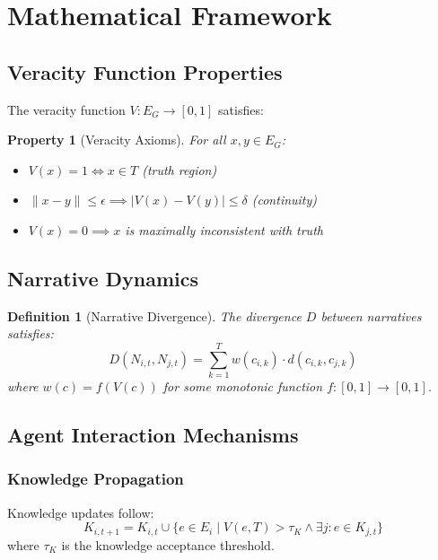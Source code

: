 \documentclass[12pt, a4paper]{article}
\newtheorem{definition}{Definition}
\newtheorem{property}{Property}
\begin{document}
\section{Mathematical Framework}

\subsection{Veracity Function Properties}
The veracity function $V: E_G \rightarrow [0,1]$ satisfies:

\begin{property}[Veracity Axioms]
For all $x,y \in E_G$:
\begin{itemize}
    \item $V(x) = 1 \iff x \in T$ (truth region)
    \item $\|x-y\| \leq \epsilon \implies |V(x) - V(y)| \leq \delta$ (continuity)
    \item $V(x) = 0 \implies x$ is maximally inconsistent with truth
\end{itemize}
\end{property}

\subsection{Narrative Dynamics}

\begin{definition}[Narrative Divergence]
The divergence $D$ between narratives satisfies:
\begin{equation}
    D(N_{i,t}, N_{j,t}) = \sum_{k=1}^T w(c_{i,k}) \cdot d(c_{i,k}, c_{j,k})
\end{equation}
where $w(c) = f(V(c))$ for some monotonic function $f:[0,1] \rightarrow [0,1]$.
\end{definition}

\subsection{Agent Interaction Mechanisms}

\subsubsection{Knowledge Propagation}
Knowledge updates follow:
\begin{equation}
    K_{i,t+1} = K_{i,t} \cup \{e \in E_i \mid V(e, T) > \tau_K \land \exists j: e \in K_{j,t}\}
\end{equation}
where $\tau_K$ is the knowledge acceptance threshold.
\end{document}
